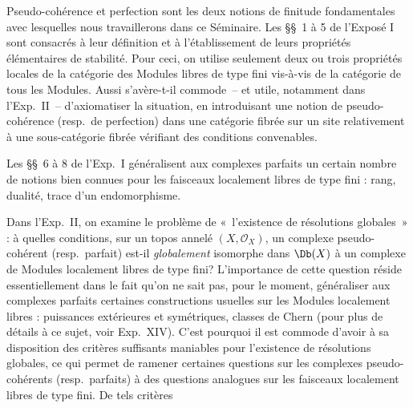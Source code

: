 Pseudo-cohérence et perfection sont les deux notions de finitude fondamentales avec lesquelles nous travaillerons dans ce Séminaire. Les §§~1 à 5 de l'Exposé I sont consacrés à leur définition et à l'établissement de leurs propriétés élémentaires de stabilité. Pour ceci, on utilise seulement deux ou trois propriétés locales de la catégorie des Modules libres de type fini vis-à-vis de la catégorie de tous les Modules. Aussi s'avère-t-il commode~-- et utile, notamment dans l'Exp.\ II~-- d'axiomatiser la situation, en introduisant une notion de pseudo-cohérence (resp.\ de perfection) dans une catégorie fibrée sur un site relativement à une sous-catégorie fibrée vérifiant des conditions convenables.

Les §§~6 à 8 de l'Exp.\ I généralisent aux complexes parfaits un certain nombre de notions bien connues pour les faisceaux localement libres de type fini : rang, dualité, trace d'un endomorphisme.

Dans l'Exp.\ II, on examine le problème de «~l'existence de résolutions globales~» : à quelles conditions, sur un topos annelé \((X,\mathcal O_X)\), un complexe pseudo-cohérent (resp.\ parfait) est-il \emph{globalement} isomorphe dans \(\Db(X)\) à un complexe de Modules localement libres de type fini? L'importance de cette question réside essentiellement dans le fait qu'on ne sait pas, pour le moment, généraliser aux complexes parfaits certaines constructions usuelles sur les Modules localement libres : puissances extérieures et symétriques, classes de Chern (pour plus de détails à ce sujet, voir Exp.\ XIV). C'est pourquoi il est commode d'avoir à sa disposition des critères suffisants maniables pour l'existence de résolutions globales, ce qui permet de ramener certaines questions sur les complexes pseudo-cohérents (resp.\ parfaits) à des questions analogues sur les faisceaux localement libres de type fini. De tels critères
